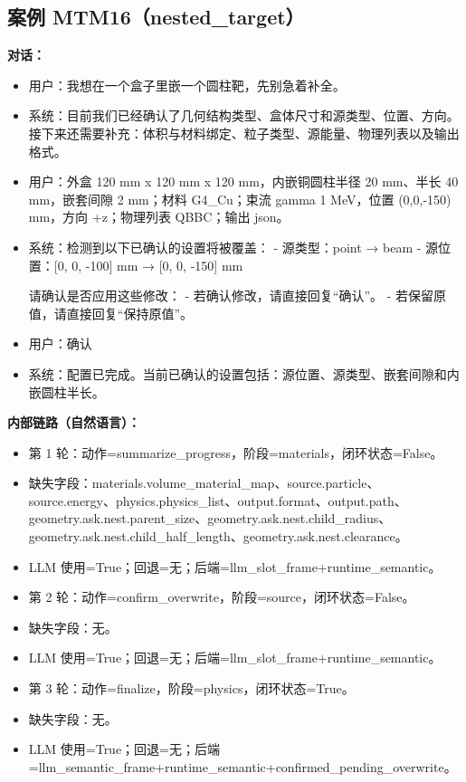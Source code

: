 \documentclass[11pt]{ctexart}
\begin{document}
\subsection{案例 MTM16（nested\_target）}
\textbf{对话：}
\begin{itemize}
\item 用户：我想在一个盒子里嵌一个圆柱靶，先别急着补全。
\item 系统：目前我们已经确认了几何结构类型、盒体尺寸和源类型、位置、方向。接下来还需要补充：体积与材料绑定、粒子类型、源能量、物理列表以及输出格式。
\item 用户：外盒 120 mm x 120 mm x 120 mm，内嵌铜圆柱半径 20 mm、半长 40 mm，嵌套间隙 2 mm；材料 G4\_Cu；束流 gamma 1 MeV，位置 (0,0,-150) mm，方向 +z；物理列表 QBBC；输出 json。
\item 系统：检测到以下已确认的设置将被覆盖：
- 源类型：point → beam
- 源位置：[0, 0, -100] mm → [0, 0, -150] mm

请确认是否应用这些修改：
- 若确认修改，请直接回复“确认”。
- 若保留原值，请直接回复“保持原值”。
\item 用户：确认
\item 系统：配置已完成。当前已确认的设置包括：源位置、源类型、嵌套间隙和内嵌圆柱半长。
\end{itemize}
\textbf{内部链路（自然语言）：}
\begin{itemize}
\item 第 1 轮：动作=summarize\_progress，阶段=materials，闭环状态=False。
\item 缺失字段：materials.volume\_material\_map、source.particle、source.energy、physics.physics\_list、output.format、output.path、geometry.ask.nest.parent\_size、geometry.ask.nest.child\_radius、geometry.ask.nest.child\_half\_length、geometry.ask.nest.clearance。
\item LLM 使用=True；回退=无；后端=llm\_slot\_frame+runtime\_semantic。
\item 第 2 轮：动作=confirm\_overwrite，阶段=source，闭环状态=False。
\item 缺失字段：无。
\item LLM 使用=True；回退=无；后端=llm\_slot\_frame+runtime\_semantic。
\item 第 3 轮：动作=finalize，阶段=physics，闭环状态=True。
\item 缺失字段：无。
\item LLM 使用=True；回退=无；后端=llm\_semantic\_frame+runtime\_semantic+confirmed\_pending\_overwrite。
\end{itemize}
\end{document}
